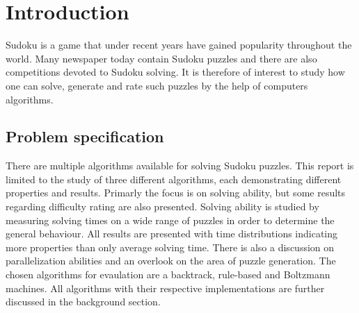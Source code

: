 \documentclass[a4paper,11pt]{kth-mag}
\begin{document}
\clearpage
\tableofcontents*
\mainmatter
\pagestyle{newchap}

\chapter{Introduction}
Sudoku is a game that under recent years have gained popularity throughout the world.
Many newspaper today contain Sudoku puzzles and there are also competitions devoted 
to Sudoku solving.
It is therefore of interest to study how one can solve, generate and rate such puzzles by the help of computers algorithms.

\FloatBarrier
\section{Problem specification}
There are multiple algorithms available for solving Sudoku puzzles.
This report is limited to the study of three different algorithms, each demonstrating different properties and results.
Primarly the focus is on solving ability, but some results regarding difficulty rating are also presented.
Solving ability is studied by measuring solving times on a wide range of puzzles in order to determine the general behaviour.
All results are presented with time distributions indicating more properties than only average solving time.
There is also a discussion on parallelization abilities and an overlook on the area of puzzle generation.
The chosen algorithms for evaulation are a backtrack, rule-based and Boltzmann machines.
All algorithms with their respective implementations are further discussed in the background section.

\FloatBarrier
\end{document}
